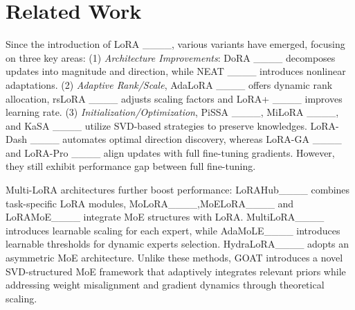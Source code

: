 \section{Related Work}
Since the introduction of LoRA ____, various variants have emerged, focusing on three key areas:
(1) \textit{Architecture Improvements}: DoRA ____ decomposes updates into magnitude and direction, while NEAT ____ introduces nonlinear adaptations.
(2) \textit{Adaptive Rank/Scale}, AdaLoRA ____ offers dynamic rank allocation, rsLoRA ____ adjusts scaling factors and LoRA+ ____ improves learning rate.
(3) \textit{Initialization/Optimization}, PiSSA ____, MiLoRA ____, and KaSA ____ utilize SVD-based strategies to preserve knowledges. LoRA-Dash ____ automates optimal direction discovery, whereas LoRA-GA ____ and LoRA-Pro ____ align updates with full fine-tuning gradients. However, they still exhibit performance gap between full fine-tuning. 

Multi-LoRA architectures further boost performance: LoRAHub____ combines task-specific LoRA modules, MoLoRA____,MoELoRA____ and LoRAMoE____ integrate MoE structures with LoRA. 
MultiLoRA____ introduces learnable scaling for each expert, while AdaMoLE____ introduces learnable thresholds for dynamic experts selection. 
HydraLoRA____ adopts an asymmetric MoE architecture. Unlike these methods, GOAT introduces a novel SVD-structured MoE framework that adaptively integrates relevant priors while addressing weight misalignment and gradient dynamics through theoretical scaling. 

